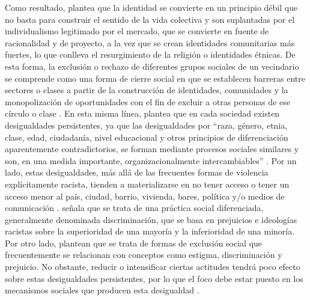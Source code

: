 \documentclass[12pt,twoside]{templates/facsothesis}
\begin{document}
Como resultado, \citet{castells_globalizacion_2005} plantea que la identidad se convierte en un principio débil que no basta para construir el sentido de la vida colectiva y son suplantadas por el individualismo legitimado por el mercado, que se convierte en fuente de racionalidad y de proyecto, a la vez que se crean identidades comunitarias más fuertes, lo que conlleva el resurgimiento de la religión o identidades étnicas. De esta forma, la exclusión o rechazo de diferentes grupos sociales de un vecindario se comprende como una forma de cierre social en que se establecen barreras entre sectores o clases a partir de la construcción de identidades, comunidades y la monopolización de oportunidades con el fin de excluir a otras personas de ese círculo o clase \citep{parkin_Marxismo_1984}. En esta misma línea, \citet{tilly_desigualdad_2000} plantea que en cada sociedad existen desigualdades persistentes, ya que las desigualdades por ``raza, género, etnia, clase, edad, ciudadanía, nivel educacional y otros principios de diferenciación aparentemente contradictorios, se forman mediante procesos sociales similares y son, en una medida importante, organizacionalmente intercambiables'' \citep[p.~23]{tilly_desigualdad_2000}. Por un lado, estas desigualdades, más allá de las frecuentes formas de violencia explícitamente racista, tienden a materializarse en no tener acceso o tener un acceso menor al país, ciudad, barrio, vivienda, bares, política y/o medios de comunicación \citep{vandijk_Racismo_2013}. \citet{vandijk_Racismo_2013} señala que se trata de una práctica social diferenciada, generalmente denominada discriminación, que se basa en prejuicios e ideologías racistas sobre la superioridad de una mayoría y la inferioridad de una minoría. Por otro lado, \citet{diez-nicolas_Exclusion_2019} plantean que se trata de formas de exclusión social que frecuentemente se relacionan con conceptos como estigma, discriminación y prejuicio. No obstante, reducir o intensificar ciertas actitudes tendrá poco efecto sobre estas desigualdades persistentes, por lo que el foco debe estar puesto en los mecanismos sociales que producen esta desigualdad \citep{tilly_desigualdad_2000}.
\end{document}
